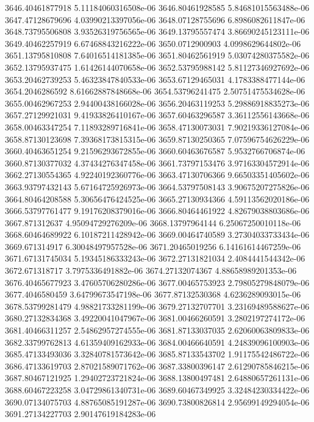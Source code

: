 {3646.40461877918 5.11184060316508e-06
3646.80461928585 5.84681015563488e-06
3647.47128679696 4.03990213397056e-06
3648.07128755696 6.8986082611847e-06
3648.73795506808 3.93526319756565e-06
3649.13795557474 3.86690245123111e-06
3649.40462257919 6.67468843216222e-06
3650.0712900903 4.0998629644802e-06
3651.13795810808 7.64016514181385e-06
3651.80462561919 5.03074280375582e-06
3652.13795937475 1.61426144070658e-06
3652.53795988142 5.81127346927692e-06
3653.20462739253 5.46323847840533e-06
3653.67129465031 4.1783388477144e-06
3654.2046286592 8.61662887848668e-06
3654.53796241475 2.50751475534628e-06
3655.00462967253 2.94400438166028e-06
3656.20463119253 5.29886918835273e-06
3657.27129921031 9.41933826410167e-06
3657.60463296587 3.36112556143668e-06
3658.00463347254 7.11893289716841e-06
3658.47130073031 7.90219336127084e-06
3658.87130123698 7.39368173815315e-06
3659.87130250365 7.07596754626229e-06
3660.40463651254 9.21596293672855e-06
3660.60463676587 5.9532766706874e-06
3660.87130377032 4.37434276347458e-06
3661.73797153476 3.97163304572914e-06
3662.27130554365 4.92240192360776e-06
3663.47130706366 9.66503351405602e-06
3663.93797432143 5.67164725926973e-06
3664.53797508143 3.90675207275826e-06
3664.80464208588 5.30656476424525e-06
3665.27130934366 4.59113562020186e-06
3666.53797761477 9.19176208379016e-06
3666.80464461922 4.82679038803686e-06
3667.871312637 4.95094729276209e-06
3668.13797964144 6.25067250010118e-06
3668.60464689922 6.10187211428942e-06
3669.00464740589 3.27304033733434e-06
3669.671314917 6.30048497957528e-06
3671.20465019256 6.14161614467259e-06
3671.67131745034 5.19345186333243e-06
3672.27131821034 2.4084441544342e-06
3672.671318717 3.7975336491882e-06
3674.27132074367 4.88658989201353e-06
3676.40465677923 3.47605706280286e-06
3677.00465753923 2.79805279848079e-06
3677.4046580459 3.64799673547198e-06
3677.87132530368 4.6236289093015e-06
3678.53799281479 4.98821733281199e-06
3679.27132707701 3.23169489588627e-06
3680.27132834368 3.49220041047967e-06
3681.00466260591 3.2802197274172e-06
3681.40466311257 2.54862957274555e-06
3681.87133037035 2.62060063809833e-06
3682.33799762813 4.61359409162933e-06
3684.00466640591 4.24839096100903e-06
3685.47133493036 3.32840781573642e-06
3685.87133543702 1.91175542486722e-06
3686.47133619703 2.87021589071762e-06
3687.33800396147 2.61290785846215e-06
3687.80467121925 1.29402723721824e-06
3688.13800497481 2.64880657261131e-06
3688.60467223258 3.04729861340731e-06
3689.60467349925 3.32484230334422e-06
3690.07134075703 4.88765085191287e-06
3690.73800826814 2.95699149294054e-06
3691.27134227703 2.90147619184283e-06
}
